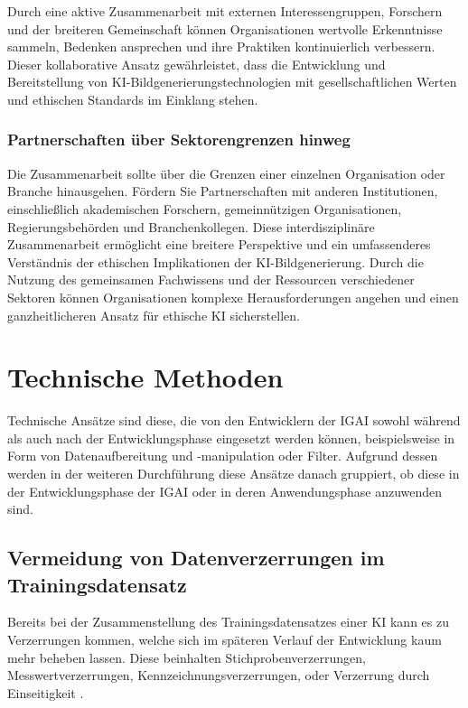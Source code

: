 \documentclass[12pt]{article}
\begin{document}
Durch eine aktive Zusammenarbeit mit externen Interessengruppen, Forschern und der breiteren Gemeinschaft können Organisationen wertvolle Erkenntnisse sammeln, Bedenken ansprechen und ihre Praktiken kontinuierlich verbessern. Dieser kollaborative Ansatz gewährleistet, dass die Entwicklung und Bereitstellung von KI-Bildgenerierungstechnologien mit gesellschaftlichen Werten und ethischen Standards im Einklang stehen.

\subsubsection{Partnerschaften über Sektorengrenzen hinweg}
Die Zusammenarbeit sollte über die Grenzen einer einzelnen Organisation oder Branche hinausgehen. Fördern Sie Partnerschaften mit anderen Institutionen, einschließlich akademischen Forschern, gemeinnützigen Organisationen, Regierungsbehörden und Branchenkollegen. Diese interdisziplinäre Zusammenarbeit ermöglicht eine breitere Perspektive und ein umfassenderes Verständnis der ethischen Implikationen der KI-Bildgenerierung. Durch die Nutzung des gemeinsamen Fachwissens und der Ressourcen verschiedener Sektoren können Organisationen komplexe Herausforderungen angehen und einen ganzheitlicheren Ansatz für ethische KI sicherstellen.

\section{Technische Methoden}
Technische Ansätze sind diese, die von den Entwicklern der IGAI sowohl während als auch nach der Entwicklungsphase eingesetzt werden können, beispielsweise in Form von Datenaufbereitung und -manipulation oder Filter. 
Aufgrund dessen werden in der weiteren Durchführung diese Ansätze danach gruppiert, ob diese in der Entwicklungsphase der IGAI oder in deren Anwendungsphase anzuwenden sind.

\subsection{Vermeidung von Datenverzerrungen im Trainingsdatensatz}
Bereits bei der Zusammenstellung des Trainingsdatensatzes einer KI kann es zu Verzerrungen kommen, welche sich im späteren Verlauf der Entwicklung kaum mehr beheben lassen.
Diese beinhalten Stichprobenverzerrungen, Messwertverzerrungen, Kennzeichnungsverzerrungen, oder Verzerrung durch Einseitigkeit \cite{Srinivasan}.
\end{document}
